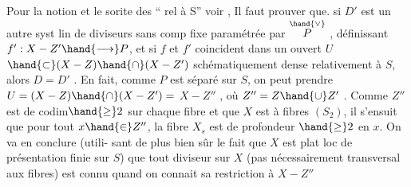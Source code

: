 Pour la notion et le sorite des ``
rel à S'' voir  ,  Il faut prouver que.
si  $D'$ est un
autre syst lin de diviseurs sans comp fixe paramétrée par $\overset{\hand{\vee}}{P}$ , 
définissant $f': X-Z' \hand{\longrightarrow} P$, et si $f$ et $f'$ coincident dans un ouvert $U$
$\hand{\subset} (X-Z)\hand{\cap}(X-Z')$ schématiquement dense relativement à $S$, alors $D=D'$ .
En fait, comme $P$ est séparé sur $S$, on peut prendre $U=(X-Z)\hand{\cap}(X-Z') =$
 $X-Z''$ , où $Z'' = Z\hand{\cup}Z'$ . Comme $Z''$ est de codim$\hand{\geq}2$
sur chaque fibre et que $X$ est à fibres $(S_2)$, il s'ensuit que pour tout
$x\hand{\in} Z''$, la fibre $X_s$ est de profondeur $\hand{\geq}2$ en $x$. On va en conclure (utili-%
sant de plus bien sûr le fait que $X$ est plat loc de présentation finie
sur $S$) que tout diviseur  sur $X$ (pas nécessairement 
transversal aux fibres) est connu quand on connait sa restriction à $X-Z''$

